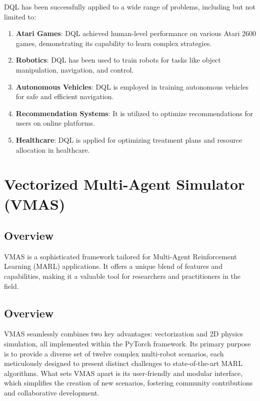 \documentclass{scrartcl}
\begin{document}
DQL has been successfully applied to a wide range of problems, including but not limited to:

\begin{enumerate}
\item \textbf{Atari Games}: DQL achieved human-level performance on various Atari 2600 games, demonstrating its capability to learn complex strategies.
\item \textbf{Robotics}: DQL has been used to train robots for tasks like object manipulation, navigation, and control.
\item \textbf{Autonomous Vehicles}: DQL is employed in training autonomous vehicles for safe and efficient navigation.
\item \textbf{Recommendation Systems}: It is utilized to optimize recommendations for users on online platforms.
\item \textbf{Healthcare}: DQL is applied for optimizing treatment plans and resource allocation in healthcare.
\end{enumerate}

\newpage

\section{Vectorized Multi-Agent Simulator (VMAS)}

\subsection{Overview}

VMAS is a sophisticated framework tailored for Multi-Agent Reinforcement Learning (MARL) applications. It offers a unique blend of features and capabilities, making it a valuable tool for researchers and practitioners in the field.

\subsection{Overview}

VMAS seamlessly combines two key advantages: vectorization and 2D physics simulation, all implemented within the PyTorch framework. Its primary purpose is to provide a diverse set of twelve complex multi-robot scenarios, each meticulously designed to present distinct challenges to state-of-the-art MARL algorithms. What sets VMAS apart is its user-friendly and modular interface, which simplifies the creation of new scenarios, fostering community contributions and collaborative development.
\end{document}
